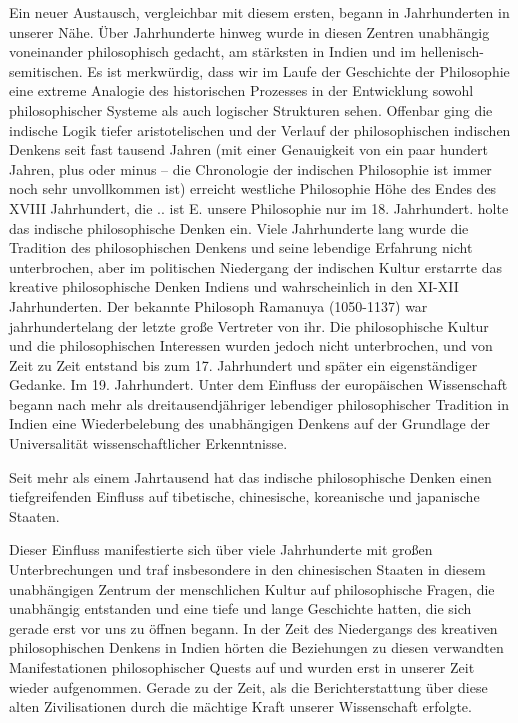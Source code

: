 \documentclass[11pt,a4paper]{book}
\begin{document}
Ein neuer Austausch, vergleichbar mit diesem ersten, begann in Jahrhunderten in unserer Nähe. Über Jahrhunderte hinweg wurde in diesen Zentren unabhängig voneinander philosophisch gedacht, am stärksten in Indien und im hellenisch-semitischen. Es ist merkwürdig, dass wir im Laufe der Geschichte der Philosophie eine extreme Analogie des historischen Prozesses in der Entwicklung sowohl philosophischer Systeme als auch logischer Strukturen sehen. Offenbar ging die indische Logik tiefer aristotelischen und der Verlauf der philosophischen indischen Denkens seit fast tausend Jahren (mit einer Genauigkeit von ein paar hundert Jahren, plus oder minus -- die Chronologie der indischen Philosophie ist immer noch sehr unvollkommen ist) erreicht westliche Philosophie Höhe des Endes des XVIII Jahrhundert, die .. ist E. unsere Philosophie nur im 18. Jahrhundert. holte das indische philosophische Denken ein. Viele Jahrhunderte lang wurde die Tradition des philosophischen Denkens und seine lebendige Erfahrung nicht unterbrochen, aber im politischen Niedergang der indischen Kultur erstarrte das kreative philosophische Denken Indiens und wahrscheinlich in den XI-XII Jahrhunderten. Der bekannte Philosoph Ramanuya (1050-1137) war jahrhundertelang der letzte große Vertreter von ihr. Die philosophische Kultur und die philosophischen Interessen wurden jedoch nicht unterbrochen, und von Zeit zu Zeit entstand bis zum 17. Jahrhundert und später ein eigenständiger Gedanke. Im 19. Jahrhundert. Unter dem Einfluss der europäischen Wissenschaft begann nach mehr als dreitausendjähriger lebendiger philosophischer Tradition in Indien eine Wiederbelebung des unabhängigen Denkens auf der Grundlage der Universalität wissenschaftlicher Erkenntnisse. 



Seit mehr als einem Jahrtausend hat das indische philosophische Denken einen tiefgreifenden Einfluss auf tibetische, chinesische, koreanische und japanische Staaten.



Dieser Einfluss manifestierte sich über viele Jahrhunderte mit großen Unterbrechungen und traf insbesondere in den chinesischen Staaten in diesem unabhängigen Zentrum der menschlichen Kultur auf philosophische Fragen, die unabhängig entstanden und eine tiefe und lange Geschichte hatten, die sich gerade erst vor uns zu öffnen begann. In der Zeit des Niedergangs des kreativen philosophischen Denkens in Indien hörten die Beziehungen zu diesen verwandten Manifestationen philosophischer Quests auf und wurden erst in unserer Zeit wieder aufgenommen. Gerade zu der Zeit, als die Berichterstattung über diese alten Zivilisationen durch die mächtige Kraft unserer Wissenschaft erfolgte.
\end{document}
